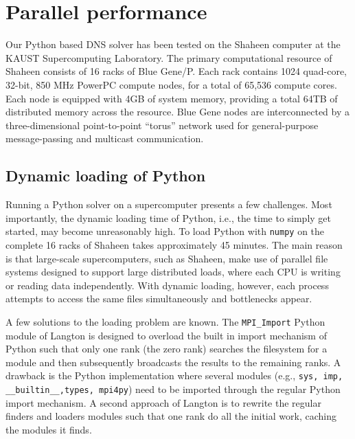 \documentclass[final,1p,times]{elsarticle}
\newcommand{\inpyth}{\lstinline[style=inlinestyle]} %[]%
\begin{document}
\section{Parallel performance}
Our Python based DNS solver has been tested on the Shaheen computer at the KAUST Supercomputing Laboratory. The primary computational resource of Shaheen consists of 16 racks of Blue Gene/P. Each rack contains 1024 quad-core, 32-bit, 850 MHz PowerPC compute nodes, for a total of 65,536 compute cores. Each node is equipped with 4GB of system memory, providing a total 64TB of distributed memory across the resource. Blue Gene nodes are interconnected by a three-dimensional point-to-point ``torus'' network used for general-purpose message-passing and multicast communication.

\subsection{Dynamic loading of Python}
Running a Python solver on a supercomputer presents a few challenges. Most importantly, the dynamic loading time of Python, i.e., the time to simply get started, may become unreasonably high. To load Python with \texttt{numpy} on the complete 16 racks of Shaheen takes approximately 45 minutes. The main reason is that large-scale supercomputers, such as Shaheen, make use of parallel file systems designed to support large distributed loads, where each CPU is writing or reading data independently. With dynamic loading, however, each process attempts to access the same files simultaneously and bottlenecks appear.

A few solutions to the loading problem are known. The \inpyth{MPI_Import} Python module of Langton \cite{mpi_import} is designed to overload the built in import mechanism of Python such that only one rank (the zero rank) searches the filesystem for a module and then subsequently broadcasts the results to the remaining ranks. A drawback is the Python implementation where several modules (e.g., \inpyth{sys, imp, __builtin__,types, mpi4py}) need to be imported through the regular Python import mechanism. A second approach of Langton is to rewrite the regular finders and loaders modules such that one rank do all the initial work, caching the modules it finds.
\end{document}
